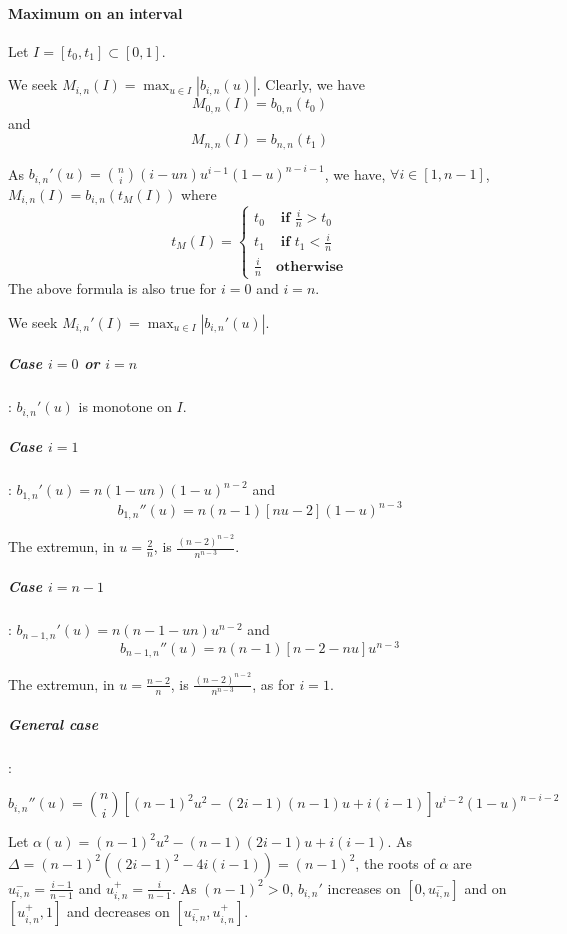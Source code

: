 \documentclass {article}
\newcommand\bernstein[2]{b_{#1, #2}}
\begin{document}
\paragraph{Maximum on an interval}
Let $I = \left[ t_0, t_1 \right] \subset \left[ 0,1 \right]$.

We seek $ M_{i,n} (I) = \max_{u \in I} |\bernstein{i}{n} (u)| $.
Clearly, we have
$$ M_{0, n} (I) = \bernstein{0}{n} (t_0) $$
and
$$ M_{n, n} (I) = \bernstein{n}{n} (t_1) $$

As $\bernstein{i}{n}' (u) = { n \choose i } ( i - u n ) u^{i-1} (1-u)^{n-i-1}$,
we have, $\forall i \in \left[ 1, n-1 \right]$, $ M_{i,n} (I) = \bernstein{i}{n} (t_M(I)) $
where
\begin{equation}
  t_M (I) = \left\lbrace
  \begin{array}{cl}
    t_0 & \textbf{ if } \frac{i}{n} > t_0 \\
    t_1 & \textbf{ if } t_1 < \frac{i}{n} \\
    \frac{i}{n} & \textbf{otherwise}
  \end{array}
  \right.
\end{equation}
The above formula is also true for $i = 0$ and $i=n$.

We seek $ M_{i,n}' (I) = \max_{u \in I} |\bernstein{i}{n}' (u)| $.

\subparagraph{Case $i = 0$ or $i = n$}: $\bernstein{i}{n}' (u)$ is monotone on $I$.

\subparagraph{Case $i = 1$}:
$ \bernstein{1}{n}' (u) = n (1 - u n) (1-u)^{n-2} $
and
$$
\bernstein{1}{n}'' (u) = n (n-1) \left[ n u - 2 \right] (1-u)^{n-3}
$$

The extremun, in $u = \frac{2}{n} $, is $\frac{(n-2)^{n-2}}{n^{n-3}}$.

\subparagraph{Case $i = n-1$}:
$ \bernstein{n-1}{n}' (u) = n (n - 1 - u n) u^{n-2} $
and
$$
\bernstein{n-1}{n}'' (u) = n (n-1) \left[ n-2 - n u \right] u^{n-3}
$$

The extremun, in $u = \frac{n-2}{n} $, is $\frac{(n-2)^{n-2}}{n^{n-3}}$, as for $i = 1$.

\subparagraph{General case}:

$$
\bernstein{i}{n}'' (u) = { n \choose i } \left[ (n-1)^2 u^2 - (2 i - 1) (n - 1) u + i (i-1) \right] u^{i-2} (1-u)^{n-i-2}
$$

Let $ \alpha(u) = (n-1)^2 u^2 - (n - 1)(2 i - 1) u + i (i-1) $.
As $\Delta = (n-1)^2 ( (2i-1)^2 - 4 i (i - 1)) = (n-1)^2$,
the roots of $\alpha$ are $ u^-_{i,n} = \frac{i-1}{n-1} $ and $ u^+_{i,n} = \frac{i}{n-1}$.
As $(n-1)^2 > 0$, $\bernstein{i}{n}'$ increases on $\left[ 0, u^-_{i,n} \right]$ and on $\left[ u^+_{i,n}, 1\right]$
and decreases on $\left[ u^-_{i,n}, u^+_{i,n} \right]$.
\end{document}
